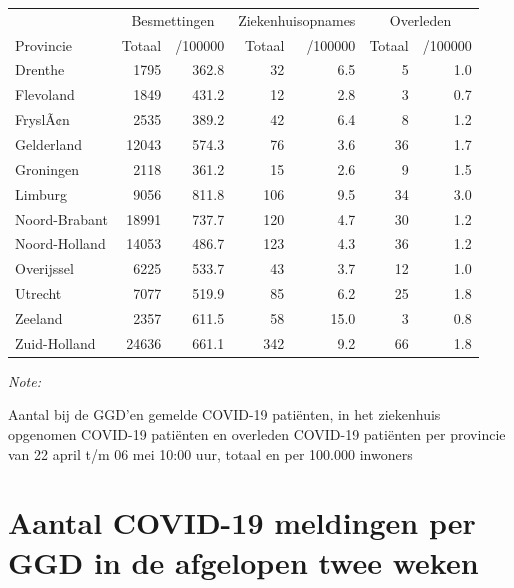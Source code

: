 \documentclass[
  english,
  man,floatsintext]{apa6}
\begin{document}
\begin{table}
\centering
\begin{threeparttable}
\begin{tabular}{lrrrrrr}
\toprule
\multicolumn{1}{c}{ } & \multicolumn{2}{c}{Besmettingen} & \multicolumn{2}{c}{Ziekenhuisopnames} & \multicolumn{2}{c}{Overleden} \\
\cmidrule(l{3pt}r{3pt}){2-3} \cmidrule(l{3pt}r{3pt}){4-5} \cmidrule(l{3pt}r{3pt}){6-7}
Provincie & Totaal & /100000 & Totaal & /100000 & Totaal & /100000\\
\midrule
Drenthe & 1795 & 362.8 & 32 & 6.5 & 5 & 1.0\\
Flevoland & 1849 & 431.2 & 12 & 2.8 & 3 & 0.7\\
FryslÃ¢n & 2535 & 389.2 & 42 & 6.4 & 8 & 1.2\\
Gelderland & 12043 & 574.3 & 76 & 3.6 & 36 & 1.7\\
Groningen & 2118 & 361.2 & 15 & 2.6 & 9 & 1.5\\
Limburg & 9056 & 811.8 & 106 & 9.5 & 34 & 3.0\\
Noord-Brabant & 18991 & 737.7 & 120 & 4.7 & 30 & 1.2\\
Noord-Holland & 14053 & 486.7 & 123 & 4.3 & 36 & 1.2\\
Overijssel & 6225 & 533.7 & 43 & 3.7 & 12 & 1.0\\
Utrecht & 7077 & 519.9 & 85 & 6.2 & 25 & 1.8\\
Zeeland & 2357 & 611.5 & 58 & 15.0 & 3 & 0.8\\
Zuid-Holland & 24636 & 661.1 & 342 & 9.2 & 66 & 1.8\\
\bottomrule
\end{tabular}
\begin{tablenotes}
\item \textit{Note: } 
\item Aantal bij de GGD’en gemelde COVID-19 patiënten, in het ziekenhuis opgenomen COVID-19 patiënten en overleden COVID-19 patiënten per provincie van 22 april t/m 06 mei 10:00 uur, totaal en per 100.000 inwoners
\end{tablenotes}
\end{threeparttable}
\end{table}

\newpage

\hypertarget{aantal-covid-19-meldingen-per-ggd-in-de-afgelopen-twee-weken}{%
\section{Aantal COVID-19 meldingen per GGD in de afgelopen twee weken}\label{aantal-covid-19-meldingen-per-ggd-in-de-afgelopen-twee-weken}}
\end{document}
